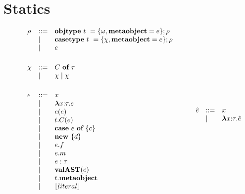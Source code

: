 \section{Statics}


\begin{figure}
\centering
\[
\begin{array}{lll}
\rho & \bnfdef & \keyw{objtype}~ t~ = \{ \omega, \keyw{metaobject}=e \}; \rho \\
     & \bnfalt & \keyw{casetype}~ t~ = \{ \chi, \keyw{metaobject}=e \}; \rho\\
     & \bnfalt & e\\
     \\[1ex]
\chi & \bnfdef & C~\keyw{of}~\tau\\
     & \bnfalt & \chi \bnfalt \chi \\
\\[1ex]
e    & \bnfdef & x \\
     & \bnfalt & \boldsymbol\lambda x{:}\tau . e \\ %
     & \bnfalt & e(e) \\
     & \bnfalt & t.C(e) \\
     & \bnfalt & \keyw{case}~e~\keyw{of}~\{ c \} \\
     & \bnfalt & \keyw{new}~ \{ d \}\\
     & \bnfalt & e.f \\
     & \bnfalt & e.m \\
     & \bnfalt & e : \tau\\
     & \bnfalt & \keyw{valAST}(e) \\
     & \bnfalt & t.\keyw{metaobject}\\
     & \bnfalt & \lfloor literal \rfloor \\
\\[1ex]	 
\end{array}
\begin{array}{lll}
~~~~
\end{array}
\begin{array}{lll}
\hat{e}    & \bnfdef & x \\
     & \bnfalt & \boldsymbol\lambda x{:}\tau . \hat{e} \\ %

\end{array}\]
\end{figure}
